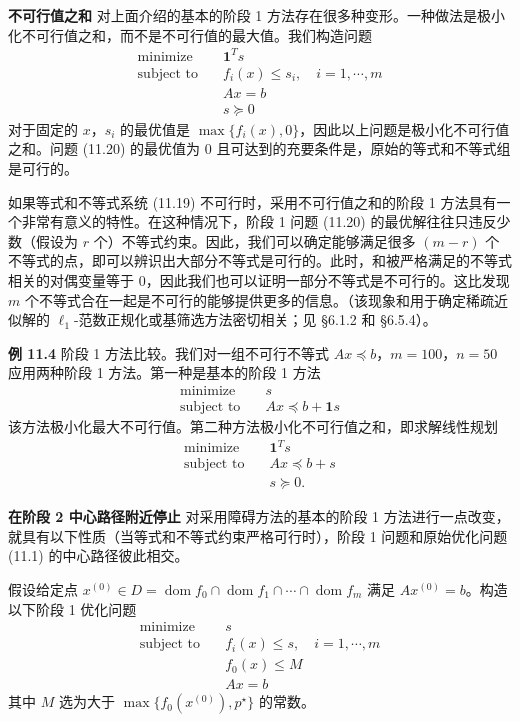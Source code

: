 \documentclass[UTF8,12pt,a4paper,fontset=fandol]{ctexart}
\begin{document}
\noindent\textbf{不可行值之和}\quad
对上面介绍的基本的阶段 1 方法存在很多种变形。一种做法是极小化不可行值之和，而不是不可行值的最大值。我们构造问题
\begin{equation}
\begin{aligned}
\text{minimize}\quad & \mathbf{1}^Ts\\
\text{subject to}\quad & f_i(x)\leq s_i,\quad i=1,\cdots,m\\
& Ax=b\\
& s\succeq 0
\end{aligned}
\tag{11.20}
\end{equation}
对于固定的 $x$，$s_i$ 的最优值是 $\max\{f_i(x),0\}$，因此以上问题是极小化不可行值之和。问题 (11.20) 的最优值为 0 且可达到的充要条件是，原始的等式和不等式组是可行的。

如果等式和不等式系统 (11.19) 不可行时，采用不可行值之和的阶段 1 方法具有一个非常有意义的特性。在这种情况下，阶段 1 问题 (11.20) 的最优解往往只违反少数（假设为 $r$ 个）不等式约束。因此，我们可以确定能够满足很多 $(m-r)$ 个不等式的点，即可以辨识出大部分不等式是可行的。此时，和被严格满足的不等式相关的对偶变量等于 0，因此我们也可以证明一部分不等式是不可行的。这比发现 $m$ 个不等式合在一起是不可行的能够提供更多的信息。（该现象和用于确定稀疏近似解的 $\ell_1$-范数正规化或基筛选方法密切相关；见 \S6.1.2 和 \S6.5.4）。

\noindent\textbf{例 11.4}\quad
阶段 1 方法比较。我们对一组不可行不等式 $Ax\preceq b$，$m=100$，$n=50$ 应用两种阶段 1 方法。第一种是基本的阶段 1 方法
\[
\begin{aligned}
\text{minimize}\quad & s\\
\text{subject to}\quad & Ax\preceq b+\mathbf{1}s
\end{aligned}
\]
该方法极小化最大不可行值。第二种方法极小化不可行值之和，即求解线性规划
\[
\begin{aligned}
\text{minimize}\quad & \mathbf{1}^Ts\\
\text{subject to}\quad & Ax\preceq b+s\\
& s\succeq 0.
\end{aligned}
\]

\noindent\textbf{在阶段 2 中心路径附近停止}\quad
对采用障碍方法的基本的阶段 1 方法进行一点改变，就具有以下性质（当等式和不等式约束严格可行时），阶段 1 问题和原始优化问题 (11.1) 的中心路径彼此相交。

假设给定点 $x^{(0)}\in D=\operatorname{dom} f_0\cap\operatorname{dom} f_1\cap\cdots\cap\operatorname{dom} f_m$ 满足 $Ax^{(0)}=b$。构造以下阶段 1 优化问题
\begin{equation}
\begin{aligned}
\text{minimize}\quad & s\\
\text{subject to}\quad & f_i(x)\leq s,\quad i=1,\cdots,m\\
& f_0(x)\leq M\\
& Ax=b
\end{aligned}
\tag{11.21}
\end{equation}
其中 $M$ 选为大于 $\max\{f_0(x^{(0)}),p^\star\}$ 的常数。
\end{document}
